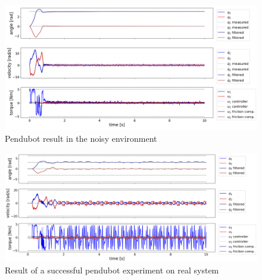 \begin{figure}[H]
    \centering
    \includegraphics[width=1.1\linewidth]{figures/hardware_result/pendubot_noisy_simulation_designC.1.png}
    \caption{Pendubot result in the noisy environment}
    \label{fig:pendubot_noisy_working}
\end{figure}

\begin{figure}[H]
    \centering
    \includegraphics[width=1.1\linewidth]{figures/hardware_result/pendubot_real_system_working.png}
    \caption{Result of a successful pendubot experiment on real system}
    \label{fig:pendubot_real_working}
\end{figure}

